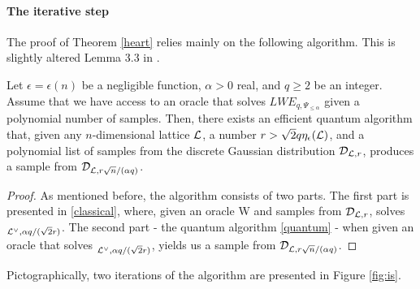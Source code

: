\paragraph{The iterative step}
The proof of Theorem \ref{heart} relies mainly on the following algorithm. This is slightly altered Lemma 3.3 in \cite{regev}. 
\begin{lemma}\label{is}
        Let $\epsilon = \epsilon(n)$ be a negligible function, $\alpha > 0$ real, and $q \geq 2$ be an integer. Assume that we have access to an oracle that solves $LWE_{q,\Psi_{\leq \alpha}}$ given a polynomial number of samples. Then, there exists an efficient quantum algorithm that, given any $n$-dimensional lattice $\mathcal{L}$, a number $r > \sqrt{2}q \eta_{\epsilon}(\mathcal{L})$, and a polynomial list of samples from the discrete Gaussian distribution $\mathcal{D}_{\mathcal{L},r}$, produces a sample from $\mathcal{D}_{\mathcal{L},r\sqrt{n}/(\alpha q)}$.
\end{lemma}
\begin{proof}
        As mentioned before, the algorithm consists of two parts. The first part is presented in \ref{classical}, where, given an oracle W and samples from $\mathcal{D}_{\mathcal{L},r}$, solves $_{\mathcal{L}^{\vee}, \alpha q / (\sqrt{2} r)}$. The second part - the quantum algorithm \ref{quantum} - when given an oracle that solves $_{\mathcal{L}^{\vee}, \alpha q / (\sqrt{2} r)}$, yields us a sample from $\mathcal{D}_{\mathcal{L}, r\sqrt{n}/(\alpha q)}$.
\end{proof}
Pictographically, two iterations of the algorithm are presented in Figure \ref{fig:is}.
